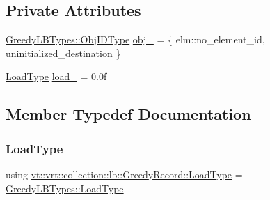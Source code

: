 \subsection*{Private Attributes}
\begin{DoxyCompactItemize}
\item 
\hyperlink{structvt_1_1vrt_1_1collection_1_1lb_1_1_greedy_l_b_types_ae22670acd689e4ff83315fac2e4acb5e}{Greedy\+L\+B\+Types\+::\+Obj\+I\+D\+Type} \hyperlink{structvt_1_1vrt_1_1collection_1_1lb_1_1_greedy_record_ab0e01d4431f547a017c9a4887bf5d207}{obj\+\_\+} = \{ elm\+::no\+\_\+element\+\_\+id, uninitialized\+\_\+destination \}
\item 
\hyperlink{structvt_1_1vrt_1_1collection_1_1lb_1_1_greedy_record_a3ac0f749c48eb624837eda5bca988845}{Load\+Type} \hyperlink{structvt_1_1vrt_1_1collection_1_1lb_1_1_greedy_record_a77a97b5c704fc0e2e9b0c14125051d74}{load\+\_\+} = 0.\+0f
\end{DoxyCompactItemize}


\subsection{Member Typedef Documentation}
\mbox{\label{structvt_1_1vrt_1_1collection_1_1lb_1_1_greedy_record_a3ac0f749c48eb624837eda5bca988845}} 
\subsubsection{\texorpdfstring{Load\+Type}{LoadType}}
{\footnotesize\ttfamily using \hyperlink{structvt_1_1vrt_1_1collection_1_1lb_1_1_greedy_record_a3ac0f749c48eb624837eda5bca988845}{vt\+::vrt\+::collection\+::lb\+::\+Greedy\+Record\+::\+Load\+Type} =  \hyperlink{structvt_1_1vrt_1_1collection_1_1lb_1_1_greedy_l_b_types_a9fe8829bc0c92e88ddf9d149233a54f4}{Greedy\+L\+B\+Types\+::\+Load\+Type}}

\mbox{\label{structvt_1_1vrt_1_1collection_1_1lb_1_1_greedy_record_a6b0754b2434fca9e865fa8422e3d709e}} 
